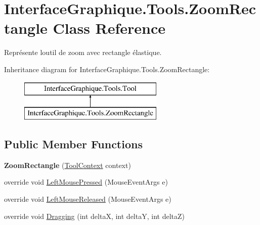\hypertarget{class_interface_graphique_1_1_tools_1_1_zoom_rectangle}{}\section{Interface\+Graphique.\+Tools.\+Zoom\+Rectangle Class Reference}
\label{class_interface_graphique_1_1_tools_1_1_zoom_rectangle}


Représente l\textquotesingle{}outil de zoom avec rectangle élastique.  


Inheritance diagram for Interface\+Graphique.\+Tools.\+Zoom\+Rectangle\+:\begin{figure}[H]
\begin{center}
\leavevmode
\includegraphics[height=2.000000cm]{class_interface_graphique_1_1_tools_1_1_zoom_rectangle}
\end{center}
\end{figure}
\subsection*{Public Member Functions}
\begin{DoxyCompactItemize}
\item 
\hypertarget{class_interface_graphique_1_1_tools_1_1_zoom_rectangle_a0e1a1918f55eab0b9762c1e062c2b5b3}{}{\bfseries Zoom\+Rectangle} (\hyperlink{class_interface_graphique_1_1_tools_1_1_tool_context}{Tool\+Context} context)\label{class_interface_graphique_1_1_tools_1_1_zoom_rectangle_a0e1a1918f55eab0b9762c1e062c2b5b3}

\item 
override void \hyperlink{class_interface_graphique_1_1_tools_1_1_zoom_rectangle_aea89e1a6d0043a6256b58d14e68331c6}{Left\+Mouse\+Pressed} (Mouse\+Event\+Args e)
\item 
override void \hyperlink{class_interface_graphique_1_1_tools_1_1_zoom_rectangle_a1b7f36743fbfc90c84ee0f32f333ca63}{Left\+Mouse\+Released} (Mouse\+Event\+Args e)
\item 
override void \hyperlink{class_interface_graphique_1_1_tools_1_1_zoom_rectangle_a8af5ed7644c22e033f4ad438f3221854}{Dragging} (int delta\+X, int delta\+Y, int delta\+Z)
\end{DoxyCompactItemize}



